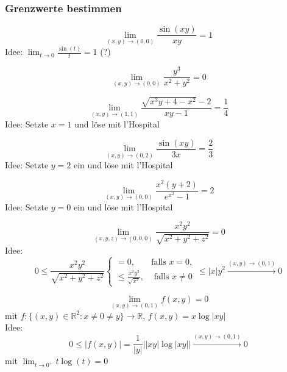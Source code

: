 \subsubsection{Grenzwerte bestimmen}
\begin{displaymath}
  \lim_{(x,y) \to (0,0)} \frac{\sin(xy)}{xy} = 1
\end{displaymath}
Idee: $\lim_{t \to 0} \frac{\sin(t)}{t} = 1$ (?)

\begin{displaymath}
  \lim_{(x,y) \to (0,0)} \frac{y^3}{x^2 + y^2} = 0
\end{displaymath}

\begin{displaymath}
  \lim_{(x,y) \to (1,1)} \frac{\sqrt{x^3y + 4 - x^2} - 2}{xy - 1} = \frac{1}{4}
\end{displaymath}
Idee: Setzte $x = 1$ und löse mit l'Hospital

\begin{displaymath}
  \lim_{(x,y) \to (0,2)} \frac{\sin(xy)}{3x} = \frac{2}{3}
\end{displaymath}
Idee: Setzte $y = 2$ ein und löse mit l'Hospital

\begin{displaymath}
  \lim_{(x,y) \to (0,0)} \frac{x^2(y + 2)}{e^{x^2} - 1} = 2
\end{displaymath}
Idee: Setzte $y = 0$ ein und löse mit l'Hospital

\begin{displaymath}
  \lim_{(x,y,z) \to (0,0,0)} \frac{x^2 y^2}{\sqrt{x^2 + y^2 + z^2}} = 0
\end{displaymath}
Idee:
\begin{displaymath}
  0 \leq \frac{x^2 y^2}{\sqrt{x^2 + y^2 + z^2}}
  \begin{cases}
    = 0,& \text{falls } x = 0,\\
    \leq \frac{x^2 y^2}{\sqrt{x^2}},& \text{ falls } x \neq 0
  \end{cases}
  \leq |x|y^2 \xrightarrow{(x,y) \to (0,1)} 0
\end{displaymath}

\begin{displaymath}
  \lim_{(x,y) \to (0,1)} f(x,y) = 0
\end{displaymath}
mit $f : \{(x,y) \in \mathbb{R}^2: x \neq 0 \neq y\} \to \mathbb{R}$, $f(x,y) = x \log |xy|$\\
Idee:
\begin{displaymath}
  0 \leq |f(x,y)| = \frac{1}{|y|} ||xy| \log |xy|| \xrightarrow{(x,y) \to (0,1)} 0
\end{displaymath}
mit $\lim_{t \to 0^+} t\log(t) = 0$

